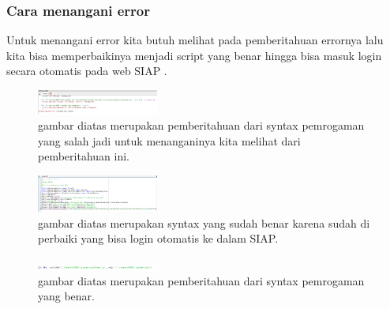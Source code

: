 \subsubsection{Cara menangani error}
Untuk menangani error kita butuh melihat pada pemberitahuan errornya lalu kita bisa memperbaikinya menjadi script yang benar hingga bisa masuk login secara otomatis pada web SIAP .
\begin{figure}[H]
		\includegraphics[width=4cm]{figures/1184065/PemberitahuanError1.PNG}
		\centering
		\caption{gambar diatas merupakan pemberitahuan dari syntax pemrogaman yang salah jadi untuk menanganinya kita melihat dari pemberitahuan ini.}
		\end{figure}
		\begin{figure}[H]
		\includegraphics[width=4cm]{figures/1184065/MenanganiError1.PNG}
		\centering
		\caption{gambar diatas merupakan syntax yang sudah benar karena sudah di perbaiki yang bisa login otomatis ke dalam SIAP.}
		\end{figure}
		\begin{figure}[H]
		\includegraphics[width=4cm]{figures/1184065/PemberitahuanBenar1.PNG}
		\centering
		\caption{gambar diatas merupakan pemberitahuan dari syntax pemrogaman yang benar.}
		\end{figure}






	
